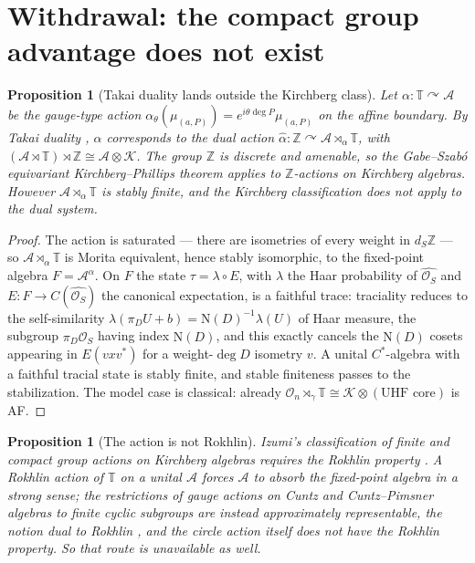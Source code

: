 \documentclass[11pt]{amsart}
\numberwithin{equation}{section}
\newtheorem{proposition}[theorem]{Proposition}
\theoremstyle{definition}
\theoremstyle{remark}
\newcommand{\Z}{\mathbb{Z}}
\newcommand{\T}{\mathbb{T}}
\newcommand{\cA}{\mathcal{A}}
\newcommand{\cO}{\mathcal{O}}
\newcommand{\Ns}{\mathrm{N}}
\begin{document}
\section{Withdrawal: the compact group advantage does not exist}

\begin{proposition}[Takai duality lands outside the Kirchberg class]\label{prop:takai}
Let $\alpha:\T\curvearrowright\cA$ be the gauge-type action
$\alpha_\theta(\mu_{(a,P)})=e^{i\theta\deg P}\mu_{(a,P)}$ on the affine boundary. By Takai
duality \cite{Takai}, $\alpha$
corresponds to the dual action $\hat\alpha:\Z\curvearrowright\cA\rtimes_\alpha\T$, with
$(\cA\rtimes\T)\rtimes\Z\cong\cA\otimes\mathcal K$. The group $\Z$ is discrete and amenable,
so the Gabe--Szab\'o equivariant Kirchberg--Phillips theorem \cite{GabeSzabo} applies to
$\Z$-actions \emph{on Kirchberg algebras}. However $\cA\rtimes_\alpha\T$ is stably finite,
and the Kirchberg classification does not apply to the dual system.
\end{proposition}

\begin{proof}
The action is saturated --- there are isometries of every weight in $d_S\Z$ --- so
$\cA\rtimes_\alpha\T$ is Morita equivalent, hence stably isomorphic, to the fixed-point
algebra $F=\cA^\alpha$. On $F$ the state $\tau=\lambda\circ E$, with $\lambda$ the Haar
probability of $\widehat{\cO_S}$ and $E:F\to C(\widehat{\cO_S})$ the canonical expectation,
is a faithful trace: traciality reduces to the self-similarity
$\lambda(\pi_DU+b)=\Ns(D)^{-1}\lambda(U)$ of Haar measure, the subgroup
$\pi_D\widehat{\cO_S}$ having index $\Ns(D)$, and this exactly cancels the
$\Ns(D)$ cosets appearing in $E(vxv^*)$ for a weight-$\deg D$ isometry $v$. A unital
$C^*$-algebra with a faithful tracial state is stably finite, and stable finiteness passes
to the stabilization. The model case is classical: already
$\cO_n\rtimes_\gamma\T\cong\mathcal K\otimes(\text{UHF core})$ is AF.
\end{proof}

\begin{proposition}[The action is not Rokhlin]\label{prop:notrokhlin}
Izumi's classification of finite and compact group actions on Kirchberg algebras requires the
Rokhlin property \cite{Izumi}. A Rokhlin action of $\T$ on a unital $\cA$ forces $\cA$ to
absorb the fixed-point algebra in a strong sense; the restrictions of gauge actions on Cuntz
and Cuntz--Pimsner algebras to finite cyclic subgroups are instead \emph{approximately
representable}, the notion dual to Rokhlin \cite{Izumi}, and the circle action itself does
not have the Rokhlin property. So that route is unavailable as well.
\end{proposition}
\end{document}
